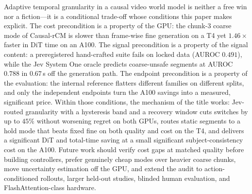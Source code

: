 \documentclass[journal]{IEEEtran}
\begin{document}
Adaptive temporal granularity in a causal video world model is neither a free win nor a fiction---it is a conditional trade-off whose conditions this paper makes explicit. The cost precondition is a property of the GPU: the chunk-3 coarse mode of Causal-rCM is slower than frame-wise fine generation on a T4 yet $1.46\times$ faster in DiT time on an A100. The signal precondition is a property of the signal content: a preregistered hand-crafted suite fails on locked data (AUROC $0.491$), while the Jev System One oracle predicts coarse-unsafe segments at AUROC $0.788$ in $0.67$\,s off the generation path. The endpoint precondition is a property of the evaluation: the internal reference flatters different families on different splits, and only the independent endpoints turn the A100 savings into a measured, significant price. Within those conditions, the mechanism of the title works: Jev-routed granularity with a hysteresis band and a recovery window cuts switches by up to $45\%$ without worsening regret on both GPUs, routes static segments to a hold mode that beats fixed fine on both quality and cost on the T4, and delivers a significant DiT and total-time saving at a small significant subject-consistency cost on the A100. Future work should verify cost gaps at matched quality before building controllers, prefer genuinely cheap modes over heavier coarse chunks, move uncertainty estimation off the GPU, and extend the audit to action-conditioned rollouts, larger held-out studies, blinded human evaluation, and FlashAttention-class hardware.



\end{document}

